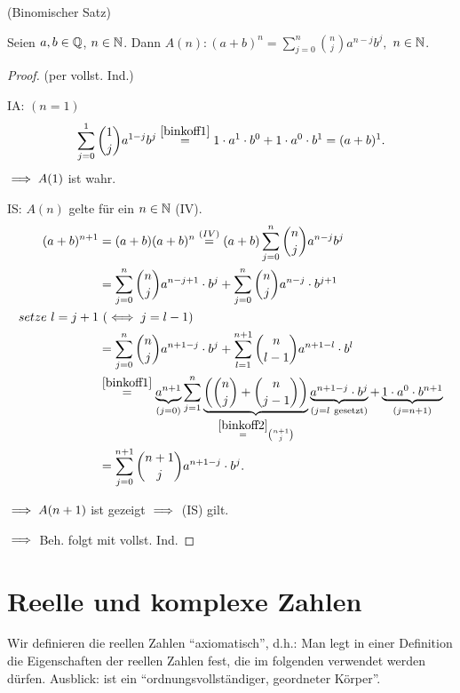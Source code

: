\documentclass[12pt]{scrreprt}
\begin{document}
\begin{bsp} (Binomischer Satz)

Seien $a, b\in\mathbb{Q}$, $n\in\mathbb{N}$. Dann $\displaystyle A(n): (a+b)^n = \sum_{j=0}^n\binom{n}{j}a^{n-j}b^j,$ $n\in\mathbb{N}$.
\begin{proof}(per vollst. Ind.)

IA: $(n=1)$
\[\sum_{j=0}^1\binom{1}{j}a^{1-j}b^j \stackrel{\ref{binkoff1}}{=} 1\cdot a^1\cdot b^0 + 1\cdot a^0\cdot b^1 = (a+b)^1.\]
$\implies A(1)$ ist wahr.

IS: $A(n)$ gelte für ein $n\in\mathbb{N}$ (IV).
\begin{align*}
(a+b)^{n+1} &= (a+b)(a+b)^n \stackrel{(IV)}{=} (a+b)\sum_{j=0}^n\binom{n}{j}a^{n-j}b^j\\
&= \sum_{j=0}^n\binom{n}{j}a^{n-j+1}\cdot b^j + \sum_{j=0}^n\binom{n}{j}a^{n-j}\cdot b^{j+1}\\
%
setze\ l = j+1&\ (\gdw j = l-1)\\
%
&=\sum_{j=0}^n\binom{n}{j}a^{n+1-j}\cdot b^j + \sum_{l=1}^{n+1}\binom{n}{l-1}a^{n+1-l}\cdot b^l\\
&\stackrel{\ref{binkoff1}}{=} \underbrace{a^{n+1}}_{(j=0)}\sum_{j=1}^n\underbrace{\left(\binom{n}{j}+\binom{n}{j-1}\right)}_{\stackrel{\ref{binkoff2}}{=}\scriptsize\binom{n+1}{j}}\underbrace{a^{n+1-j}\cdot b^j}_{(j=l\ \mathrm{gesetzt})}+\underbrace{1\cdot a^0\cdot b^{n+1}}_{(j=n+1)}\\
&= \sum_{j=0}^{n+1}\binom{n+1}{j}a^{n+1-j}\cdot b^j.
\end{align*}

$\implies A(n+1)$ ist gezeigt $\implies$ (IS) gilt.

$\implies$ Beh. folgt mit vollst. Ind.
\end{proof}
\end{bsp}

\chapter{Reelle und komplexe Zahlen}
\label{cha:zahlen}
Wir definieren die reellen Zahlen "`axiomatisch"', d.h.: Man legt in einer Definition die 
Eigenschaften der reellen Zahlen fest, die im folgenden verwendet werden dürfen.
Ausblick:  ist ein "`ordnungsvollständiger, geordneter Körper"'.
\end{document}

